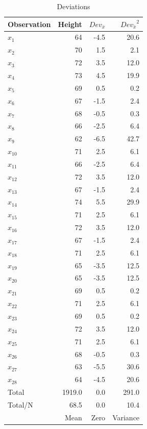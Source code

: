 \documentclass[nohyper,justified]{tufte-handout}\usepackage[]{graphicx}\usepackage[]{color}
\newcommand{\dev}[1] {Dev_{\bar{#1}}}
\begin{document}
\begin{table}[ht]
\centering
\begin{tabular}{lrrr}
  \toprule
Observation & Height & $\dev{x}$ & ${\dev{x}}^2$ \\ 
  \midrule
$x_{1}$ & 64 & -4.5 & 20.6 \\ 
   \rowcolor[gray]{0.95}$x_{2}$ & 70 & 1.5 & 2.1 \\ 
  $x_{3}$ & 72 & 3.5 & 12.0 \\ 
   \rowcolor[gray]{0.95}$x_{4}$ & 73 & 4.5 & 19.9 \\ 
  $x_{5}$ & 69 & 0.5 & 0.2 \\ 
   \rowcolor[gray]{0.95}$x_{6}$ & 67 & -1.5 & 2.4 \\ 
  $x_{7}$ & 68 & -0.5 & 0.3 \\ 
   \rowcolor[gray]{0.95}$x_{8}$ & 66 & -2.5 & 6.4 \\ 
  $x_{9}$ & 62 & -6.5 & 42.7 \\ 
   \rowcolor[gray]{0.95}$x_{10}$ & 71 & 2.5 & 6.1 \\ 
  $x_{11}$ & 66 & -2.5 & 6.4 \\ 
   \rowcolor[gray]{0.95}$x_{12}$ & 72 & 3.5 & 12.0 \\ 
  $x_{13}$ & 67 & -1.5 & 2.4 \\ 
   \rowcolor[gray]{0.95}$x_{14}$ & 74 & 5.5 & 29.9 \\ 
  $x_{15}$ & 71 & 2.5 & 6.1 \\ 
   \rowcolor[gray]{0.95}$x_{16}$ & 72 & 3.5 & 12.0 \\ 
  $x_{17}$ & 67 & -1.5 & 2.4 \\ 
   \rowcolor[gray]{0.95}$x_{18}$ & 71 & 2.5 & 6.1 \\ 
  $x_{19}$ & 65 & -3.5 & 12.5 \\ 
   \rowcolor[gray]{0.95}$x_{20}$ & 65 & -3.5 & 12.5 \\ 
  $x_{21}$ & 69 & 0.5 & 0.2 \\ 
   \rowcolor[gray]{0.95}$x_{22}$ & 71 & 2.5 & 6.1 \\ 
  $x_{23}$ & 69 & 0.5 & 0.2 \\ 
   \rowcolor[gray]{0.95}$x_{24}$ & 72 & 3.5 & 12.0 \\ 
  $x_{25}$ & 71 & 2.5 & 6.1 \\ 
   \rowcolor[gray]{0.95}$x_{26}$ & 68 & -0.5 & 0.3 \\ 
  $x_{27}$ & 63 & -5.5 & 30.6 \\ 
   \rowcolor[gray]{0.95}$x_{28}$ & 64 & -4.5 & 20.6 \\ 
   \bottomrule
Total & 1919.0 &  0.0 & 291.0 \\ 
\rowcolor[gray]{0.95}Total/N & 68.5 &  0.0 & 10.4 \\ 
 & Mean & Zero & Variance \\
\end{tabular}
\caption{Deviations} 
\end{table}
\end{document}
